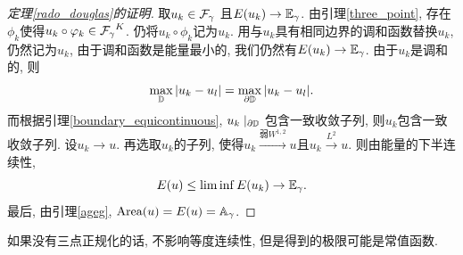 \begin{proof}[定理\eqref{rado_douglas}的证明]
    取$u_k \in {\mathcal{F}_\gamma}$ 且$E(u_k) \to {\mathbb{E}_\gamma}$. 由引理\eqref{three_point}, 存在$\phi_k$使得$u_k\circ {\varphi}_k \in {\mathcal{F}_\gamma}^K$. 仍将$u_k\circ \phi_k$记为$u_k$.  用与$u_k$具有相同边界的调和函数替换$u_k$, 仍然记为$u_k$, 由于调和函数是能量最小的, 我们仍然有$E(u_k) \to {\mathbb{E}_\gamma}$.  由于$u_k$是调和的, 则
    \begin{equation}
        \max_{{\mathbb{D}}}{\left | u_k - u_l \right |} = \max_{{\partial} {\mathbb{D}}} {\left | u_k-u_l \right |}.
    \end{equation}
    而根据引理\eqref{boundary_equicontinuous}, $u_k\mid_{{\partial} {\mathbb{D}}}$ 包含一致收敛子列, 则$u_k$包含一致收敛子列. 设$u_k \to u$.  再选取$u_k$的子列, 使得$u_k \overset{\text{弱}W^{1,2}}{\longrightarrow} u$且$u_k \overset{L^2}{\longrightarrow} u$. 则由能量的下半连续性, 
    \begin{equation}
        E(u) \le \liminf E(u_k) \to {\mathbb{E}_\gamma}.
    \end{equation}
    最后, 由引理\eqref{ageg}, $\text{Area}(u)=E(u)={\mathbb{A}_\gamma}$.
\end{proof}
\ifcomment
    \begin{remark}
        如果没有三点正规化的话, 不影响等度连续性, 但是得到的极限可能是常值函数.
    \end{remark}
\fi
